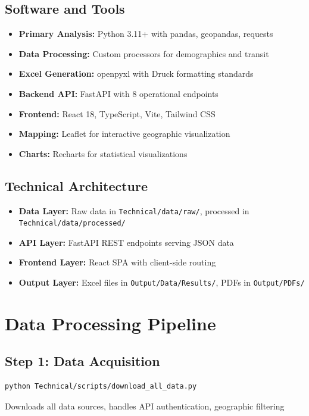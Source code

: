 \documentclass[11pt,letterpaper]{article}
\begin{document}
\subsection{Software and Tools}
\begin{itemize}
    \item \textbf{Primary Analysis:} Python 3.11+ with pandas, geopandas, requests
    \item \textbf{Data Processing:} Custom processors for demographics and transit
    \item \textbf{Excel Generation:} openpyxl with Druck formatting standards
    \item \textbf{Backend API:} FastAPI with 8 operational endpoints
    \item \textbf{Frontend:} React 18, TypeScript, Vite, Tailwind CSS
    \item \textbf{Mapping:} Leaflet for interactive geographic visualization
    \item \textbf{Charts:} Recharts for statistical visualizations
\end{itemize}

\subsection{Technical Architecture}
\begin{itemize}
    \item \textbf{Data Layer:} Raw data in \texttt{Technical/data/raw/}, processed in \texttt{Technical/data/processed/}
    \item \textbf{API Layer:} FastAPI REST endpoints serving JSON data
    \item \textbf{Frontend Layer:} React SPA with client-side routing
    \item \textbf{Output Layer:} Excel files in \texttt{Output/Data/Results/}, PDFs in \texttt{Output/PDFs/}
\end{itemize}

\section{Data Processing Pipeline}

\subsection{Step 1: Data Acquisition}
\begin{verbatim}
python Technical/scripts/download_all_data.py
\end{verbatim}
Downloads all data sources, handles API authentication, geographic filtering
\end{document}

